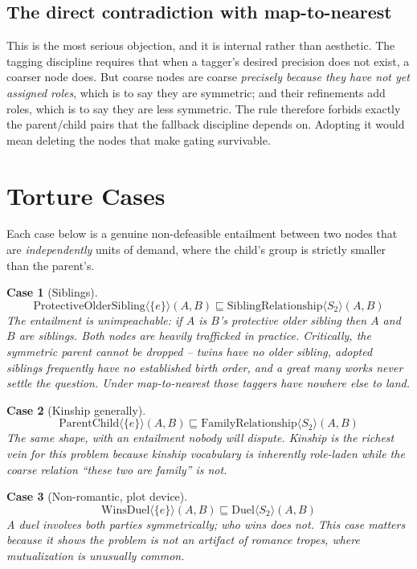 \documentclass{amsart}
\newtheorem{tc}{Case}
\theoremstyle{remark}
\begin{document}
    \subsection{The direct contradiction with map-to-nearest}
    This is the most serious objection, and it is internal rather than aesthetic. The tagging discipline requires that when a tagger's desired precision does not exist, a coarser node does. But coarse nodes are coarse \emph{precisely because they have not yet assigned roles}, which is to say they are symmetric; and their refinements add roles, which is to say they are less symmetric. The rule therefore forbids exactly the parent/child pairs that the fallback discipline depends on. Adopting it would mean deleting the nodes that make gating survivable.

    \section{Torture Cases}
    Each case below is a genuine non-defeasible entailment between two nodes that are \emph{independently} units of demand, where the child's group is strictly smaller than the parent's.

    \begin{tc}[Siblings]
        \[
            \mathrm{ProtectiveOlderSibling}\langle\{e\}\rangle(A,B) \sqsubseteq \mathrm{SiblingRelationship}\langle S_2\rangle(A,B)
        \]
        The entailment is unimpeachable: if $A$ is $B$'s protective older sibling then $A$ and $B$ are siblings. Both nodes are heavily trafficked in practice. Critically, the symmetric parent cannot be dropped -- twins have no older sibling, adopted siblings frequently have no established birth order, and a great many works never settle the question. Under map-to-nearest those taggers have nowhere else to land.
    \end{tc}

    \begin{tc}[Kinship generally]
        \[
            \mathrm{ParentChild}\langle\{e\}\rangle(A,B) \sqsubseteq \mathrm{FamilyRelationship}\langle S_2\rangle(A,B)
        \]
        The same shape, with an entailment nobody will dispute. Kinship is the richest vein for this problem because kinship vocabulary is inherently role-laden while the coarse relation ``these two are family'' is not.
    \end{tc}

    \begin{tc}[Non-romantic, plot device]
        \[
            \mathrm{WinsDuel}\langle\{e\}\rangle(A,B) \sqsubseteq \mathrm{Duel}\langle S_2\rangle(A,B)
        \]
        A duel involves both parties symmetrically; who wins does not. This case matters because it shows the problem is not an artifact of romance tropes, where mutualization is unusually common.
    \end{tc}
\end{document}
